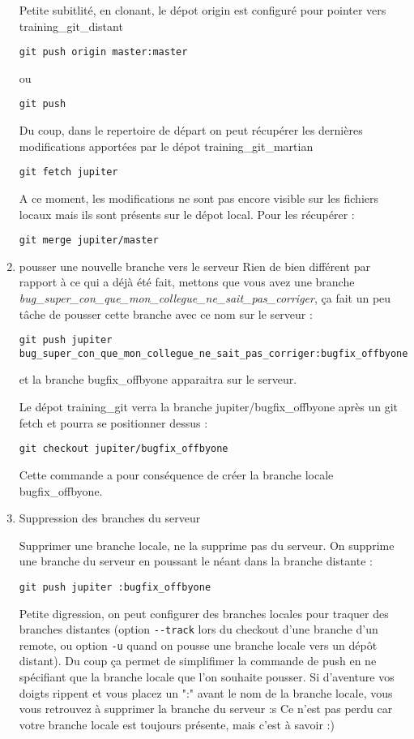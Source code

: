 \documentclass[10pt]{exam}
\begin{document}
\begin{questions}
\begin{enumerate}
Petite subitlité, en clonant, le dépot origin est configuré pour pointer vers training\_git\_distant
\begin{lstlisting}
git push origin master:master
\end{lstlisting}
ou
\begin{lstlisting}
git push
\end{lstlisting}
Du coup, dans le repertoire de départ on peut récupérer les dernières modifications apportées par le dépot training\_git\_martian
\begin{lstlisting}
git fetch jupiter
\end{lstlisting}
A ce moment, les modifications ne sont pas encore visible sur les fichiers locaux mais ils sont présents sur le dépot local. Pour les récupérer :
\begin{lstlisting}
git merge jupiter/master
\end{lstlisting}

\item pousser une nouvelle branche vers le serveur
  Rien de bien différent par rapport à ce qui a déjà été fait, mettons que vous avez une branche \emph{bug\_super\_con\_que\_mon\_collegue\_ne\_sait\_pas\_corriger}, ça fait un peu tâche de pousser cette branche avec ce nom sur le serveur :
\begin{lstlisting}
git push jupiter bug_super_con_que_mon_collegue_ne_sait_pas_corriger:bugfix_offbyone
\end{lstlisting}
et la branche bugfix\_offbyone apparaitra sur le serveur.

Le dépot training\_git verra la branche jupiter/bugfix\_offbyone après un git fetch et pourra se positionner dessus :
\begin{lstlisting}
git checkout jupiter/bugfix_offbyone
\end{lstlisting}
Cette commande a pour conséquence de créer la branche locale bugfix\_offbyone.

\item Suppression des branches du serveur

Supprimer une branche locale, ne la supprime pas du serveur. On supprime une branche du serveur en poussant le néant dans la branche distante :
\begin{lstlisting}
git push jupiter :bugfix_offbyone
\end{lstlisting}
Petite digression, on peut configurer des branches locales pour traquer des branches distantes (option \texttt{-{}-track} lors du checkout d'une branche d'un remote, ou option \texttt{-u} quand on pousse une branche locale vers un dépôt distant). Du coup ça permet de simplifimer la commande de push en ne spécifiant que la branche locale que l'on souhaite pousser. Si d'aventure vos doigts rippent et vous placez un ":" avant le nom de la branche locale, vous vous retrouvez à supprimer la branche du serveur :s Ce n'est pas perdu car votre branche locale est toujours présente, mais c'est à savoir :)
\end{enumerate}


\end{questions}
\end{document}
